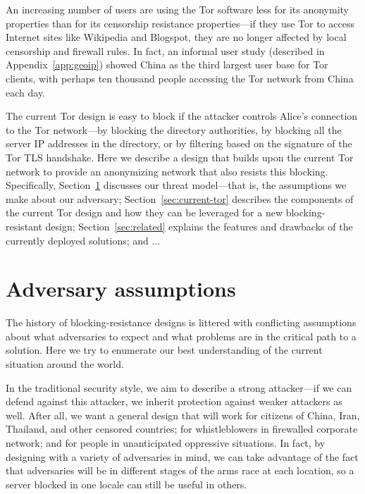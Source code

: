 \documentclass{llncs}
\begin{document}
An increasing number of users are using the Tor software
less for its anonymity properties than for its censorship
resistance properties---if they use Tor to access Internet sites like
Wikipedia
and Blogspot, they are no longer affected by local censorship
and firewall rules. In fact, an informal user study (described in
Appendix~\ref{app:geoip}) showed China as the third largest user base
for Tor clients, with perhaps ten thousand people accessing the Tor
network from China each day.

The current Tor design is easy to block if the attacker controls Alice's
connection to the Tor network---by blocking the directory authorities,
by blocking all the server IP addresses in the directory, or by filtering
based on the signature of the Tor TLS handshake. Here we describe a
design that builds upon the current Tor network to provide an anonymizing
network that also resists this blocking. Specifically,
Section~\ref{sec:adversary} discusses our threat model---that is,
the assumptions we make about our adversary; Section~\ref{sec:current-tor}
describes the components of the current Tor design and how they can be
leveraged for a new blocking-resistant design; Section~\ref{sec:related}
explains the features and drawbacks of the currently deployed solutions;
and ...



\section{Adversary assumptions}
\label{sec:adversary}

The history of blocking-resistance designs is littered with conflicting
assumptions about what adversaries to expect and what problems are
in the critical path to a solution. Here we try to enumerate our best
understanding of the current situation around the world.

In the traditional security style, we aim to describe a strong
attacker---if we can defend against this attacker, we inherit protection
against weaker attackers as well. After all, we want a general design
that will work for citizens of China, Iran, Thailand, and other censored
countries; for
whistleblowers in firewalled corporate network; and for people in
unanticipated oppressive situations. In fact, by designing with
a variety of adversaries in mind, we can take advantage of the fact that
adversaries will be in different stages of the arms race at each location,
so a server blocked in one locale can still be useful in others.
\end{document}
